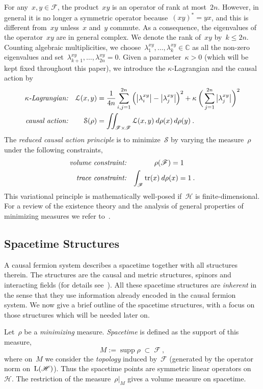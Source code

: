 \documentclass[reqno,11pt]{amsart}
\numberwithin{equation}{section}
\newcommand{\C}{\mathbb{C}}
\newcommand{\1}{\mbox{\rm 1 \hspace{-1.05 em} 1}}
\renewcommand{\H}{\mathscr{H}}
\newcommand{\F}{{\mathscr{F}}}
\renewcommand{\L}{{\mathcal{L}}}
\newcommand{\Sact}{{\mathcal{S}}}
\newcommand{\Lin}{\text{\rm{L}}}
\DeclareMathOperator{\tr}{tr}
\DeclareMathOperator{\supp}{supp}
\begin{document}
For any~$x, y \in \F$, the product~$x y$ is an operator of rank at most~$2n$. 
However, in general it is no longer a symmetric operator because~$(xy)^* = yx$,
and this is different from~$xy$ unless~$x$ and~$y$ commute.
As a consequence, the eigenvalues of the operator~$xy$ are in general complex.
We denote the rank of~$xy$ by~$k \leq 2n$. Counting algebraic multiplicities, we choose~$\lambda^{xy}_1, \ldots, \lambda^{xy}_{k} \in \C$ as all the non-zero eigenvalues and set~$\lambda^{xy}_{k+1}, \ldots, \lambda^{xy}_{2n}=0$.
Given a parameter~$\kappa>0$ (which will be kept fixed throughout this paper),
we introduce the $\kappa$-Lagrangian and the causal action by
\begin{align}
\text{\em{$\kappa$-Lagrangian:}} && \L(x,y) &= 
\frac{1}{4n} \sum_{i,j=1}^{2n} \Big( \big|\lambda^{xy}_i \big|
- \big|\lambda^{xy}_j \big| \Big)^2 + \kappa\: \bigg( \sum_{j=1}^{2n} \big|\lambda^{xy}_j \big| \bigg)^2 \label{Lagrange} \\
\text{\em{causal action:}} && \Sact(\rho) &= \iint_{\F \times \F} \L(x,y)\: d\rho(x)\, d\rho(y) \:. \label{Sdef}
\end{align}
The {\em{reduced causal action principle}} is to minimize~$\Sact$ by varying the measure~$\rho$
under the following constraints,
\begin{align}
\text{\em{volume constraint:}} && \rho(\F) = 1 \quad\;\; \label{volconstraint} \\
\text{\em{trace constraint:}} && \int_\F \tr(x)\: d\rho(x) = 1 \:. \label{trconstraint}
\end{align}
This variational principle is mathematically well-posed if~$\H$ is finite-dimensional.
For a review of the existence theory and the analysis of general properties of minimizing measures
we refer to~\cite[Chapter~12]{intro}.

\subsection{Spacetime Structures}
A causal fermion system describes a spacetime together with all structures therein.
The structures are the causal and metric structures, spinors
and interacting fields (for details see~\cite[Chapter~1]{cfs}).
All these spacetime structures are {\em{inherent}} in the sense that they use information
already encoded in the causal fermion system.
We now give a brief outline of the spacetime structures, with a focus on those structures
which will be needed later on.

Let~$\rho$ be a {\em{minimizing}} measure. {\em{Spacetime}}
is defined as the support of this measure,
\[ %
M := \supp \rho \;\subset\; \F \:, \]
where on~$M$ we consider the {\em{topology}} induced by~$\F$ (generated by the operator norm
on~$\Lin(\H)$).
Thus the spacetime points are symmetric linear operators on~$\H$.
The restriction of the measure~$\rho|_M$ gives a volume measure on spacetime.
\end{document}
